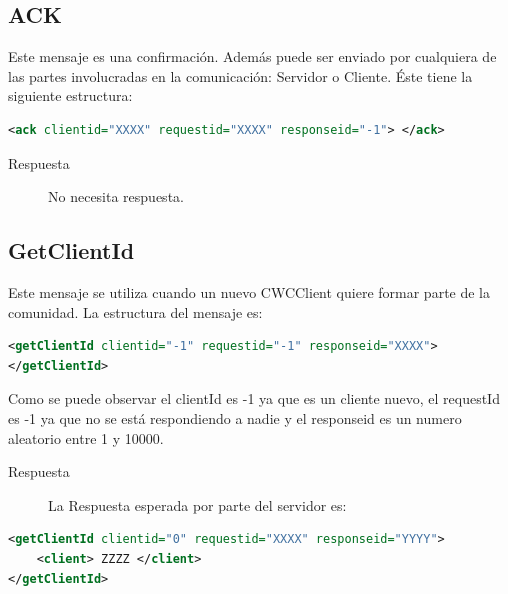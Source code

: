 
\subsection{ACK}

Este mensaje es una confirmación. Además puede ser enviado por cualquiera de las partes involucradas en la comunicación: Servidor o Cliente. Éste tiene la siguiente estructura:

\begin{lstlisting}[language=XML,caption=Mensaje ACK]
<ack clientid="XXXX" requestid="XXXX" responseid="-1"> </ack>
\end{lstlisting}

\begin{description}
\item[Respuesta] No necesita respuesta.
\end{description}


\subsection{GetClientId}

Este mensaje se utiliza cuando un nuevo CWCClient quiere formar parte de la comunidad. La estructura del mensaje es:

\begin{lstlisting}[language=XML,caption=Mensaje GetClientId]
<getClientId clientid="-1" requestid="-1" responseid="XXXX"> 
</getClientId>
\end{lstlisting}


Como se puede observar el clientId es -1 ya que es un cliente nuevo, el requestId es -1 ya que no se está respondiendo a nadie y el responseid es un numero aleatorio entre 1 y 10000. 

\begin{description}
\item[Respuesta] La Respuesta esperada por parte del servidor es:
\end{description}

 \begin{lstlisting}[language=XML,caption=Mensaje de Respuesta GetClientId]
<getClientId clientid="0" requestid="XXXX" responseid="YYYY"> 
	<client> ZZZZ </client>
</getClientId>
\end{lstlisting}

